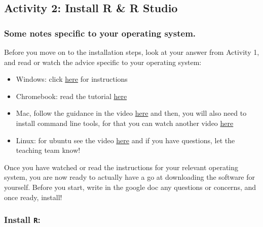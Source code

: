 \documentclass[
]{book}
\providecommand{\tightlist}{%
  \setlength{\itemsep}{0pt}\setlength{\parskip}{0pt}}
\begin{document}
\hypertarget{activity-2-install-r-r-studio}{%
\subsection{Activity 2: Install R \& R Studio}\label{activity-2-install-r-r-studio}}

\hypertarget{some-notes-specific-to-your-operating-system.}{%
\subsubsection{Some notes specific to your operating system.}\label{some-notes-specific-to-your-operating-system.}}

Before you move on to the installation steps, look at your answer from Activity 1, and read or watch the advice specific to your operating system:

\begin{itemize}
\tightlist
\item
  Windows: click \href{https://www.youtube.com/watch?v=VLWaED9jTiA}{here} for instructions
\item
  Chromebook: read the tutorial \href{https://blog.sellorm.com/2018/12/20/installing-r-and-rstudio-on-a-chromebook/}{here}
\item
  Mac, follow the guidance in the video \href{https://www.youtube.com/watch?v=cX532N_XLIs\&list=PLqzoL9-eJTNDw71zWePXyHx3_cm_fMP8S}{here} and then, you will also need to install command line tools, for that you can watch another video \href{https://www.youtube.com/watch?v=3Yd9J_dhSfY}{here}
\item
  Linux: for ubuntu see the video \href{https://www.youtube.com/watch?v=kF0-FH-xBiE}{here} and if you have questions, let the teaching team know!
\end{itemize}

Once you have watched or read the instructions for your relevant operating system, you are now ready to actually have a go at downloading the software for yourself. Before you start, write in the google doc any questions or concerns, and once ready, install!

\hypertarget{install-r}{%
\subsubsection*{\texorpdfstring{Install \texttt{R}:}{Install R:}}\label{install-r}}
\end{document}
